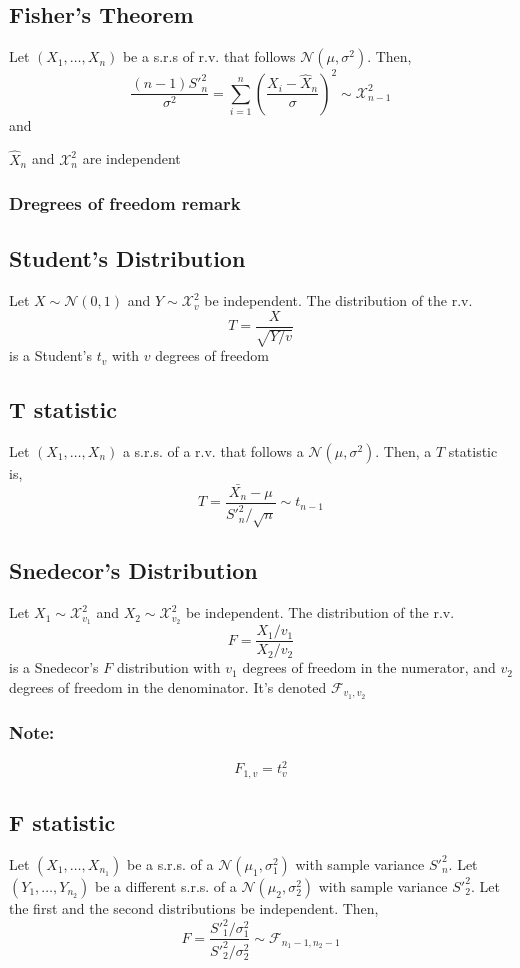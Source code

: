 \subsection{Fisher's Theorem}
Let $(X_1,\dots,X_n)$ be a s.r.s of r.v. that follows
$\mathcal{N}(\mu,\sigma^2)$. Then,
\[ \frac{(n-1)S'^2_n}{\sigma^2} = \sum_{i=1}^{n} (\frac{X_i -
\hat{X}_n}{\sigma})^2 \sim \mathcal{X}_{n-1}^2 \] and
\begin{center}
    $\hat{X}_n$ and $\mathcal{X}_n^2$ are independent
\end{center}

\subsubsection{Dregrees of freedom remark}

\subsection{Student's Distribution}
Let $X \sim \mathcal{N}(0,1)$ and $Y \sim \mathcal{X}_v^2$ be independent. The
distribution of the r.v. 
\[ T = \frac{X}{\sqrt{Y/v}} \] is a Student's $t_v$ with $v$ degrees of freedom

\subsection{T statistic}
Let $(X_1,\dots,X_n)$ a s.r.s. of a r.v. that follows a
$\mathcal{N}(\mu,\sigma^2)$. Then, a $T$ statistic is,
\[ T = \frac{\bar{X_n}-\mu}{S'^2_n / \sqrt{n}} \sim t_{n-1}\]

\subsection{Snedecor's Distribution}
Let $X_1 \sim \mathcal{X}_{v_1}^2$ and $X_2 \sim \mathcal{X}_{v_2}^2$ be
independent. The distribution of the r.v.
\[ F = \frac{X_1/v_1}{X_2/v_2} \] is a Snedecor's $F$ distribution with $v_1$
degrees of freedom in the numerator, and $v_2$ degrees of freedom in the
denominator. It's denoted $\mathcal{F}_{v_1,v_2}$

\subsubsection{Note:}
\[ F_{1,v} = t^2_v \]

\subsection{F statistic}
Let $(X_1,\dots,X_{n_1})$ be a s.r.s. of a $\mathcal{N}(\mu_1,\sigma^2_1)$ with
sample variance $S'^2_n$. Let $(Y_1,\dots,Y_{n_2})$ be a different s.r.s. of a
$\mathcal{N}(\mu_2,\sigma^2_2)$ with sample variance $S'^2_2$. Let the first and
the second distributions be independent. Then,
\[ F = \frac{S'^2_1/\sigma^2_1}{S'^2_2/\sigma^2_2} \sim
\mathcal{F}_{n_1-1,n_2-1}\]

